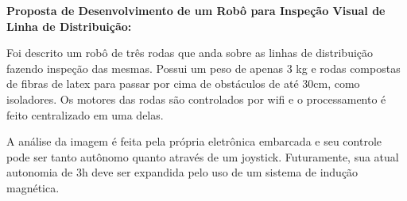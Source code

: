 
\textbf{Proposta de Desenvolvimento de um Robô para Inspeção Visual de Linha
de Distribuição:}

Foi descrito um robô de três rodas que anda sobre as linhas de distribuição
fazendo inspeção das mesmas. Possui um peso de apenas 3 kg e rodas compostas de
fibras de latex para passar por cima de obstáculos de até 30cm, como isoladores.
Os motores das rodas são controlados por wifi e o processamento é feito
centralizado em uma delas.

A análise da imagem é feita pela própria eletrônica embarcada e seu controle
pode ser tanto autônomo quanto através de um joystick. Futuramente, sua atual
autonomia de 3h deve ser expandida pelo uso de um sistema de indução magnética.
